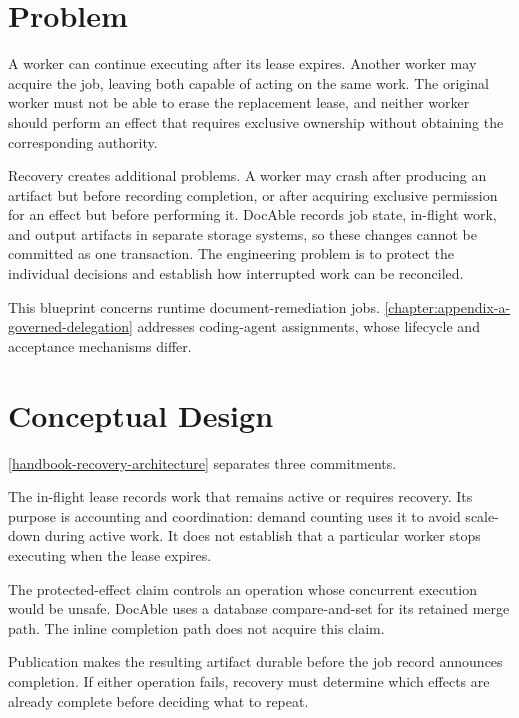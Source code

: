 
\section{Problem}

A worker can continue executing after its lease expires. Another worker may acquire the job, leaving both capable of acting on the same work. The original worker must not be able to erase the replacement lease, and neither worker should perform an effect that requires exclusive ownership without obtaining the corresponding authority.

Recovery creates additional problems. A worker may crash after producing an artifact but before recording completion, or after acquiring exclusive permission for an effect but before performing it. DocAble records job state, in-flight work, and output artifacts in separate storage systems, so these changes cannot be committed as one transaction. The engineering problem is to protect the individual decisions and establish how interrupted work can be reconciled.

This blueprint concerns runtime document-remediation jobs. \autoref{chapter:appendix-a-governed-delegation} addresses coding-agent assignments, whose lifecycle and acceptance mechanisms differ.

\section{Conceptual Design}

\autoref{handbook-recovery-architecture} separates three commitments.


The in-flight lease records work that remains active or requires recovery. Its purpose is accounting and coordination: demand counting uses it to avoid scale-down during active work. It does not establish that a particular worker stops executing when the lease expires.

The protected-effect claim controls an operation whose concurrent execution would be unsafe. DocAble uses a database compare-and-set for its retained merge path. The inline completion path does not acquire this claim.

Publication makes the resulting artifact durable before the job record announces completion. If either operation fails, recovery must determine which effects are already complete before deciding what to repeat.

